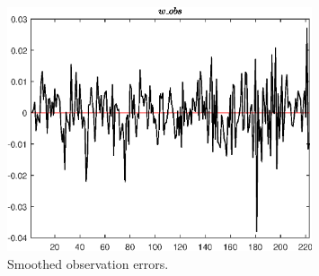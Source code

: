  
\begin{figure}[H]
\centering 
\includegraphics[width=0.80\textwidth]{RBC_sectoral/graphs/RBC_sectoral_SmoothedObservationErrors1}
\caption{Smoothed observation errors.}\label{Fig:SmoothedObservationErrors:1}
\end{figure}


